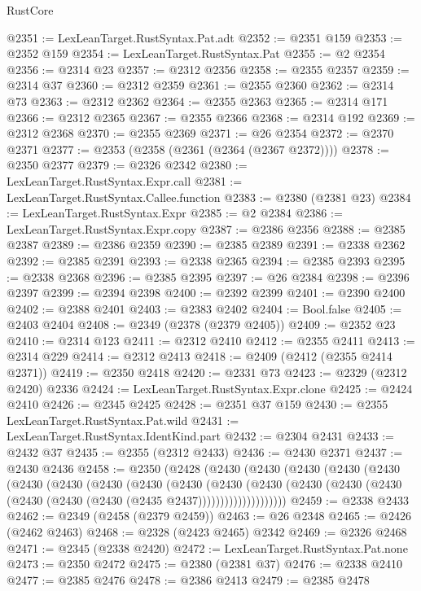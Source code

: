 \begin{lexlean}{RustCore}
\begin{coremodule}
@2351 := LexLeanTarget.RustSyntax.Pat.adt
@2352 := @2351 @159
@2353 := @2352 @159
@2354 := LexLeanTarget.RustSyntax.Pat
@2355 := @2 @2354
@2356 := @2314 @23
@2357 := @2312 @2356
@2358 := @2355 @2357
@2359 := @2314 @37
@2360 := @2312 @2359
@2361 := @2355 @2360
@2362 := @2314 @73
@2363 := @2312 @2362
@2364 := @2355 @2363
@2365 := @2314 @171
@2366 := @2312 @2365
@2367 := @2355 @2366
@2368 := @2314 @192
@2369 := @2312 @2368
@2370 := @2355 @2369
@2371 := @26 @2354
@2372 := @2370 @2371
@2377 := @2353 (@2358 (@2361 (@2364 (@2367 @2372))))
@2378 := @2350 @2377
@2379 := @2326 @2342
@2380 := LexLeanTarget.RustSyntax.Expr.call
@2381 := LexLeanTarget.RustSyntax.Callee.function
@2383 := @2380 (@2381 @23)
@2384 := LexLeanTarget.RustSyntax.Expr
@2385 := @2 @2384
@2386 := LexLeanTarget.RustSyntax.Expr.copy
@2387 := @2386 @2356
@2388 := @2385 @2387
@2389 := @2386 @2359
@2390 := @2385 @2389
@2391 := @2338 @2362
@2392 := @2385 @2391
@2393 := @2338 @2365
@2394 := @2385 @2393
@2395 := @2338 @2368
@2396 := @2385 @2395
@2397 := @26 @2384
@2398 := @2396 @2397
@2399 := @2394 @2398
@2400 := @2392 @2399
@2401 := @2390 @2400
@2402 := @2388 @2401
@2403 := @2383 @2402
@2404 := Bool.false
@2405 := @2403 @2404
@2408 := @2349 (@2378 (@2379 @2405))
@2409 := @2352 @23
@2410 := @2314 @123
@2411 := @2312 @2410
@2412 := @2355 @2411
@2413 := @2314 @229
@2414 := @2312 @2413
@2418 := @2409 (@2412 (@2355 @2414 @2371))
@2419 := @2350 @2418
@2420 := @2331 @73
@2423 := @2329 (@2312 @2420) @2336
@2424 := LexLeanTarget.RustSyntax.Expr.clone
@2425 := @2424 @2410
@2426 := @2345 @2425
@2428 := @2351 @37 @159
@2430 := @2355 LexLeanTarget.RustSyntax.Pat.wild
@2431 := LexLeanTarget.RustSyntax.IdentKind.part
@2432 := @2304 @2431
@2433 := @2432 @37
@2435 := @2355 (@2312 @2433)
@2436 := @2430 @2371
@2437 := @2430 @2436
@2458 := @2350
    (@2428
      (@2430
        (@2430
          (@2430
            (@2430
              (@2430
                (@2430
                  (@2430
                    (@2430
                      (@2430
                        (@2430
                          (@2430
                            (@2430
                              (@2430
                                (@2430 (@2430 (@2430 (@2430 (@2430 (@2435 @2437))))))))))))))))))))
@2459 := @2338 @2433
@2462 := @2349 (@2458 (@2379 @2459))
@2463 := @26 @2348
@2465 := @2426 (@2462 @2463)
@2468 := @2328 (@2423 @2465) @2342
@2469 := @2326 @2468
@2471 := @2345 (@2338 @2420)
@2472 := LexLeanTarget.RustSyntax.Pat.none
@2473 := @2350 @2472
@2475 := @2380 (@2381 @37)
@2476 := @2338 @2410
@2477 := @2385 @2476
@2478 := @2386 @2413
@2479 := @2385 @2478

\end{coremodule}
\end{lexlean}
